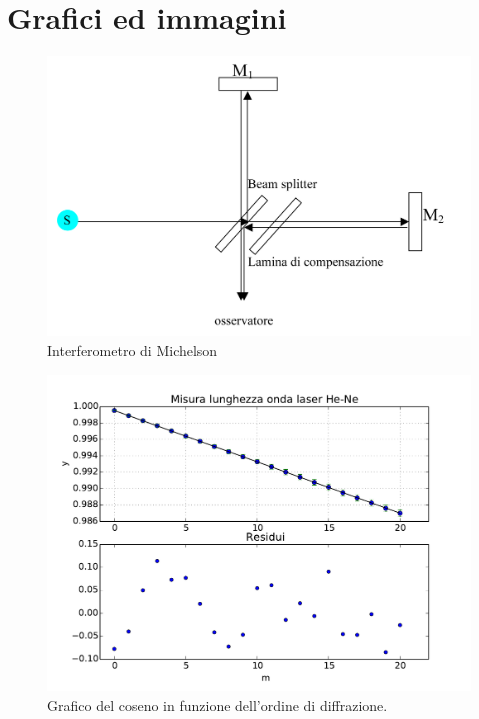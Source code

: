 \section{Grafici ed immagini}
\begin{figure}[h]
	\centering
	\includegraphics[scale=0.5]{Ottica 2B Interferometro di Michelson-1.png}
	\caption{Interferometro di Michelson}
	\label{f:figura_1}
\end{figure}
\begin{figure}[h]
	\centering
	\includegraphics[scale=0.5]{grafico.pdf}
	\caption{Grafico del coseno in funzione dell'ordine di diffrazione.}
           \label{f:figura_2}
\end{figure}
